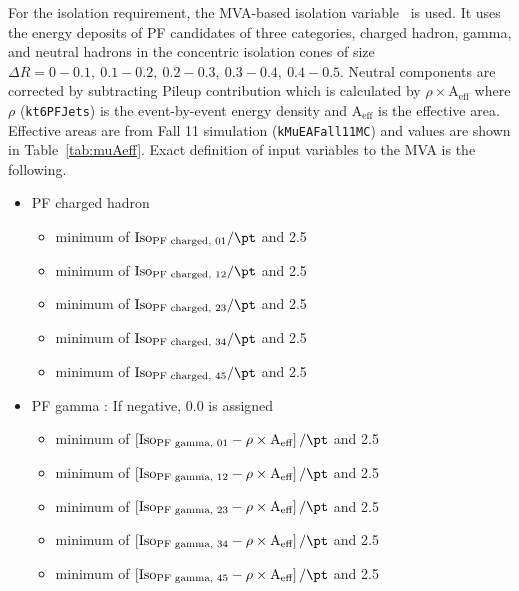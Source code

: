 For the isolation requirement, the MVA-based isolation variable~\cite{MuonRingIso} is used.
It uses the energy deposits of PF candidates of three categories, 
charged hadron, gamma, and neutral hadrons in the concentric isolation cones
of size $\Delta R = 0-0.1,~0.1-0.2,~0.2-0.3,~0.3-0.4,~0.4-0.5$.
Neutral components are corrected by subtracting Pileup contribution which is 
calculated by $\rho \times \textrm{A}_{\textrm{eff}}$ where $\rho$ (\texttt{kt6PFJets}) is the 
event-by-event energy density and $\textrm{A}_{\textrm{eff}}$ is the effective area.  
Effective areas are from Fall 11 simulation (\texttt{kMuEAFall11MC}) and 
values are shown in Table~\ref{tab:muAeff}.  
Exact definition of input variables to the MVA is the following. 
\begin{itemize}
\item PF charged hadron
	\begin{itemize}
    \item minimum of $\textrm{Iso}_\textrm{PF charged, 01}/\pt$ and 2.5	
    \item minimum of $\textrm{Iso}_\textrm{PF charged, 12}/\pt$ and 2.5	
    \item minimum of $\textrm{Iso}_\textrm{PF charged, 23}/\pt$ and 2.5	
    \item minimum of $\textrm{Iso}_\textrm{PF charged, 34}/\pt$ and 2.5	
    \item minimum of $\textrm{Iso}_\textrm{PF charged, 45}/\pt$ and 2.5	
	\end{itemize}
\item PF gamma : If negative, 0.0 is assigned
	\begin{itemize}
    \item minimum of $\left[\textrm{Iso}_\textrm{PF gamma, 01} - \rho \times \textrm{A}_{\textrm{eff}}\right]/\pt$ and 2.5 
    \item minimum of $\left[\textrm{Iso}_\textrm{PF gamma, 12} - \rho \times \textrm{A}_{\textrm{eff}}\right]/\pt$ and 2.5 
    \item minimum of $\left[\textrm{Iso}_\textrm{PF gamma, 23} - \rho \times \textrm{A}_{\textrm{eff}}\right]/\pt$ and 2.5 
    \item minimum of $\left[\textrm{Iso}_\textrm{PF gamma, 34} - \rho \times \textrm{A}_{\textrm{eff}}\right]/\pt$ and 2.5 
    \item minimum of $\left[\textrm{Iso}_\textrm{PF gamma, 45} - \rho \times \textrm{A}_{\textrm{eff}}\right]/\pt$ and 2.5 
	\end{itemize}

\end{itemize}
